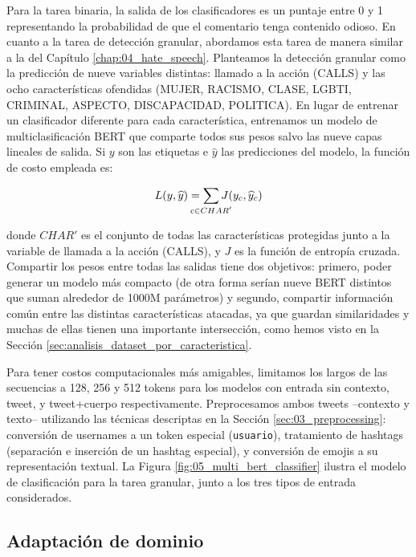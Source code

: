 Para la tarea binaria, la salida de los clasificadores es un puntaje entre 0 y 1 representando la probabilidad de que el comentario tenga contenido odioso. En cuanto a la tarea de detección granular, abordamos esta tarea de manera similar a la \subtaskb{} del Capítulo \ref{chap:04_hate_speech}. Planteamos la detección granular como la predicción de nueve variables distintas: llamado a la acción (CALLS) y las ocho características ofendidas (MUJER, RACISMO, CLASE, LGBTI, CRIMINAL, ASPECTO, DISCAPACIDAD, POLITICA). En lugar de entrenar un clasificador diferente para cada característica, entrenamos un modelo de multiclasificación BERT que comparte todos sus pesos salvo las nueve capas lineales de salida. Si $y$ son las etiquetas e $\widehat{y}$ las predicciones del modelo, la función de costo empleada es:

\begin{equation*}
    L(y, \widehat{y}) = \sum\limits_{\mathclap{c \in CHAR'}} J(y_c, \widehat{y}_c)
\end{equation*}

\noindent donde $CHAR'$ es el conjunto de todas las características protegidas junto a la variable de llamada a la acción (CALLS), y $ J$ es la función de entropía cruzada. Compartir los pesos entre todas las salidas tiene dos objetivos: primero, poder generar un modelo más compacto (de otra forma serían nueve BERT distintos que suman alrededor de \num{1000}M parámetros) y segundo, compartir información común entre las distintas características atacadas, ya que guardan similaridades y muchas de ellas tienen una importante intersección, como hemos visto en la Sección \ref{sec:analisis_dataset_por_caracteristica}.

Para tener costos computacionales más amigables, limitamos los largos de las secuencias a 128, 256 y 512 tokens para los modelos con entrada sin contexto, tweet, y tweet+cuerpo respectivamente. Preprocesamos ambos tweets --contexto y texto-- utilizando las técnicas descriptas en la Sección \ref{sec:03_preprocessing}: conversión de usernames a un token especial (\verb|usuario|), tratamiento de hashtags (separación e inserción de un hashtag especial), y conversión de emojis a su representación textual. La Figura \ref{fig:05_multi_bert_classifier} ilustra el modelo de clasificación para la tarea granular, junto a los tres tipos de entrada considerados.

\subsection{Adaptación de dominio}

